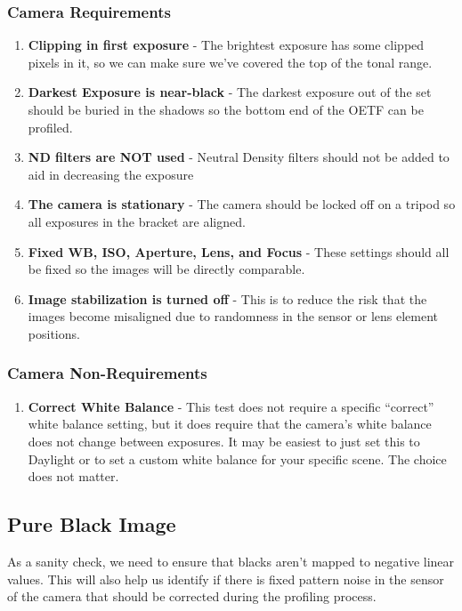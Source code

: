 \documentclass[twoside]{article}
\begin{document}
\subsubsection{Camera Requirements}
\begin{enumerate}
    \item \textbf{Clipping in first exposure} - The brightest exposure has some clipped pixels in it, so we can make sure we've covered the top of the tonal range.
    \item \textbf{Darkest Exposure is near-black} - The darkest exposure out of the set should be buried in the shadows so the bottom end of the OETF can be profiled.
    \item \textbf{ND filters are NOT used} - Neutral Density filters should not be added to aid in decreasing the exposure
    \item \textbf{The camera is stationary} - The camera should be locked off on a tripod so all exposures in the bracket are aligned.
    \item \textbf{Fixed WB, ISO, Aperture, Lens, and Focus} - These settings should all be fixed so the images will be directly comparable.
    \item \textbf{Image stabilization is turned off} - This is to reduce the risk that the images become misaligned due to randomness in the sensor or lens element positions.
\end{enumerate}

\subsubsection{Camera Non-Requirements}
\begin{enumerate}
    \item \textbf{Correct White Balance} - This test does not require a specific ``correct'' white balance setting, but it does require that the camera's white balance does not change between exposures. It may be easiest to just set this to Daylight or to set a custom white balance for your specific scene. The choice does not matter.
\end{enumerate}


\subsection{Pure Black Image}
As a sanity check, we need to ensure that blacks aren't mapped to negative linear values. This will also help us identify if there is fixed pattern noise in the sensor of the camera that should be corrected during the profiling process.
\end{document}
